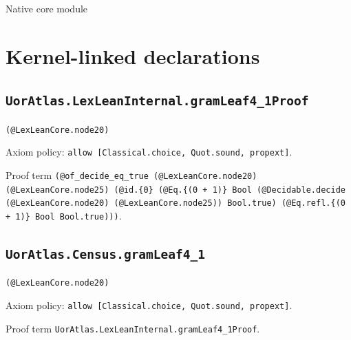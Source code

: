 \documentclass[11pt]{article}
\begin{document}
\begin{center}{\LARGE Native core module}\end{center}
\section*{Kernel-linked declarations}
\subsection*{\texttt{UorAtlas.LexLeanInternal.gramLeaf4\_1Proof}}
\noindent\texttt{(@LexLeanCore.node20)}\par
\noindent Axiom policy: \texttt{allow [Classical.choice, Quot.sound, propext]}.\par
\noindent Proof term \texttt{(@of\_decide\_eq\_true (@LexLeanCore.node20) (@LexLeanCore.node25) (@id.\{0\} (@Eq.\{(0 + 1)\} Bool (@Decidable.decide (@LexLeanCore.node20) (@LexLeanCore.node25)) Bool.true) (@Eq.refl.\{(0 + 1)\} Bool Bool.true)))}.\par
\subsection*{\texttt{UorAtlas.Census.gramLeaf4\_1}}
\noindent\texttt{(@LexLeanCore.node20)}\par
\noindent Axiom policy: \texttt{allow [Classical.choice, Quot.sound, propext]}.\par
\noindent Proof term \texttt{UorAtlas.LexLeanInternal.gramLeaf4\_1Proof}.\par
\end{document}
